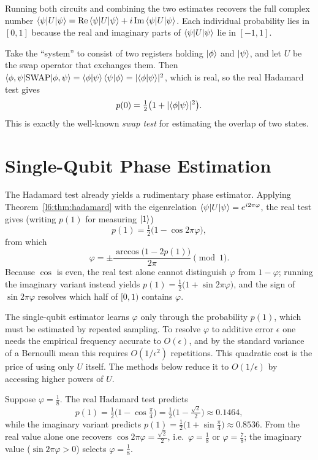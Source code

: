 Running both circuits and combining the two estimates recovers the full complex
number $\braket{\psi|U|\psi}=\mathrm{Re}\braket{\psi|U|\psi}
+i\,\mathrm{Im}\braket{\psi|U|\psi}$. Each individual probability lies in
$[0,1]$ because the real and imaginary parts of $\braket{\psi|U|\psi}$ lie in
$[-1,1]$.

\begin{remark}
Take the ``system'' to consist of two registers holding $\ket{\phi}$ and
$\ket{\psi}$, and let $U$ be the swap operator that exchanges them. Then
$\braket{\phi,\psi|\mathrm{SWAP}|\phi,\psi}=\braket{\phi|\psi}\braket{\psi|\phi}
=\lvert\braket{\phi|\psi}\rvert^{2}$, which is real, so the real Hadamard test gives
\[
  p(0)=\tfrac12\big(1+\lvert\braket{\phi|\psi}\rvert^{2}\big).
\]
This is exactly the well-known \emph{swap test} for estimating the overlap of
two states.
\end{remark}

\section{Single-Qubit Phase Estimation}

The Hadamard test already yields a rudimentary phase estimator. Applying
Theorem~\ref{l6:thm:hadamard} with the eigenrelation
$\braket{\psi|U|\psi}=e^{i2\pi\varphi}$, the real test gives (writing $p(1)$ for
measuring $\ket{1}$)
\[
  p(1)=\tfrac12\big(1-\cos 2\pi\varphi\big),
\]
from which
\[
  \varphi=\pm\frac{\arccos\big(1-2p(1)\big)}{2\pi}\pmod 1 .
\]
Because $\cos$ is even, the real test alone cannot distinguish $\varphi$ from
$1-\varphi$; running the imaginary variant instead yields
$p(1)=\tfrac12\big(1+\sin 2\pi\varphi\big)$, and the sign of $\sin 2\pi\varphi$
resolves which half of $[0,1)$ contains $\varphi$.

\begin{remark}
The single-qubit estimator learns $\varphi$ only through the probability
$p(1)$, which must be estimated by repeated sampling. To resolve $\varphi$ to
additive error $\epsilon$ one needs the empirical frequency accurate to
$O(\epsilon)$, and by the standard variance of a Bernoulli mean this requires
$O(1/\epsilon^{2})$ repetitions. This quadratic cost is the price of using only
$U$ itself. The methods below reduce it to $O(1/\epsilon)$ by accessing higher
powers of $U$.
\end{remark}

\begin{example}
Suppose $\varphi=\tfrac18$. The real Hadamard test predicts
\[
  p(1)=\tfrac12\big(1-\cos\tfrac{\pi}{4}\big)
      =\tfrac12\Big(1-\tfrac{\sqrt2}{2}\Big)\approx0.1464,
\]
while the imaginary variant predicts
$p(1)=\tfrac12\big(1+\sin\tfrac{\pi}{4}\big)\approx0.8536$. From the real value
alone one recovers $\cos 2\pi\varphi=\tfrac{\sqrt2}{2}$, i.e.\ $\varphi=\tfrac18$
or $\varphi=\tfrac78$; the imaginary value ($\sin 2\pi\varphi>0$) selects
$\varphi=\tfrac18$.
\end{example}

